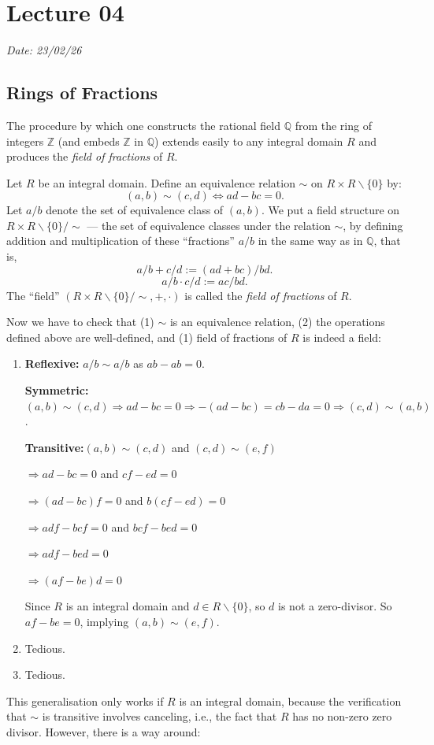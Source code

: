 \chapter{Lecture 04}\label{Lec04}
\hfill {\footnotesize \textit{Date: 23/02/26}}
\section{Rings of Fractions}
The procedure by which one constructs the rational field \(\mathbb{Q}\) from the ring of integers \(\mathbb{Z}\) (and embeds \(\mathbb{Z}\) in \(\mathbb{Q}\)) extends easily to any integral domain \(R\) and produces the \emph{field of fractions} of \(R\).
\begin{definition}
 Let \( R \) be an integral domain. Define an equivalence relation \(\sim\) on \(R \times R \smallsetminus \{0\}\) by:
\[
(a, b) \sim (c, d) \iff ad - bc = 0.
\] 
Let \(a/b\) denote the set of equivalence class of \((a,b)\). We put a field structure on \(R \times R \smallsetminus \{0\}/\sim\) --- the set of equivalence classes under the relation \(\sim\), by defining addition and multiplication of these ``fractions'' \(a/b\) in the same way as in \(\mathbb{Q}\), that is,  
\[
a/b + c/d := (ad + bc)/bd.
\]  
\[
a/b \cdot c/d := ac/bd.
\] 
The ``field'' \((R \times R \smallsetminus \{0\}/\sim, +, \cdot)\) is called the \emph{field of fractions} of \(R\).
\end{definition}

Now we have to check that (1) \(\sim\) is an equivalence relation, (2) the operations defined above are well-defined, and (1) field of fractions of  \(R\) is indeed a field:
\begin{enumerate}[label=\arabic*)]
    \item \textbf{Reflexive:} \(a/b \sim a/b\) as  \(ab - ab = 0\).

        \textbf{Symmetric:} \((a,b) \sim (c,d) \Longrightarrow ad - bc = 0 \Longrightarrow -(ad - bc) = cb - da = 0 \Longrightarrow (c,d) \sim (a,b)\).

        \textbf{Transitive:}\((a,b) \sim (c, d)\) and  \((c,d) \sim (e,f)\)

        \(\Longrightarrow ad - bc = 0\) and \(cf - ed = 0\) 

        \(\Longrightarrow (ad - bc)f = 0\) and \(b(cf - ed) = 0\) 

        \(\Longrightarrow adf - bcf = 0\) and \(bcf - bed = 0\)

         \(\Longrightarrow adf - bed = 0\) 

         \(\Longrightarrow (af - be) d = 0\)

         Since \(R\) is an integral domain and \(d \in R \smallsetminus \{0\}\),  so \(d\) is not a zero-divisor. So \(af - be = 0\), implying  \((a,b) \sim (e,f)\).
    \item Tedious. 
    \item Tedious. 
\end{enumerate}
This generalisation only works if \(R\) is an integral domain, because the verification that  \(\sim\) is transitive involves canceling, i.e., the fact that  \(R\) has no non-zero zero divisor. However, there is a way around:

